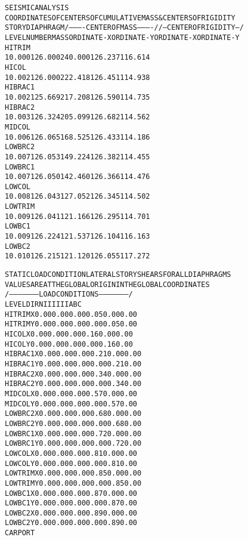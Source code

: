 \documentclass[12pt,notitle,letterpaper]{report}
\renewenvironment{quote}
  {\small\list{}{\rightmargin=0cm \leftmargin=0cm}%
   \item\relax}
  {\endlist}
\begin{document}
\begin{quote}
\begin{alltt}
SEISMIC ANALYSIS
COORDINATES OF CENTERS OF CUMULATIVE MASS & CENTERS OF RIGIDITY
STORY  DIAPHRAGM /----------CENTER OF MASS----------//--CENTER OF RIGIDITY--/
LEVEL     NUMBER        MASS  ORDINATE-X  ORDINATE-Y  ORDINATE-X  ORDINATE-Y
HITRIM
                1       0.000     126.000     240.000     126.237     116.614
HICOL
                1       0.002     126.000     222.418     126.451     114.938
HIBRAC1
                1       0.002     125.669     217.208     126.590     114.735
HIBRAC2
                1       0.003     126.324     205.099     126.682     114.562
MIDCOL
                1       0.006     126.065     168.525     126.433     114.186
LOWBRC2
                1       0.007     126.053     149.224     126.382     114.455
LOWBRC1
                1       0.007     126.050     142.460     126.366     114.476
LOWCOL
                1       0.008     126.043     127.052     126.345     114.502
LOWTRIM
                1       0.009     126.041     121.166     126.295     114.701
LOWBC1
                1       0.009     126.224     121.537     126.104     116.163
LOWBC2
                1       0.010     126.215     121.120     126.055     117.272


STATIC LOAD CONDITION LATERAL STORY SHEARS FOR ALL DIAPHRAGMS
VALUES ARE AT THE GLOBAL ORIGIN IN THE GLOBAL COORDINATES
                /---------------------LOAD  CONDITIONS---------------------/
LEVEL     DIRN           I        II       III         A         B         C
HITRIM       X        0.00      0.00      0.00      0.05      0.00      0.00
HITRIM       Y        0.00      0.00      0.00      0.00      0.05      0.00
HICOL        X        0.00      0.00      0.00      0.16      0.00      0.00
HICOL        Y        0.00      0.00      0.00      0.00      0.16      0.00
HIBRAC1      X        0.00      0.00      0.00      0.21      0.00      0.00
HIBRAC1      Y        0.00      0.00      0.00      0.00      0.21      0.00
HIBRAC2      X        0.00      0.00      0.00      0.34      0.00      0.00
HIBRAC2      Y        0.00      0.00      0.00      0.00      0.34      0.00
MIDCOL       X        0.00      0.00      0.00      0.57      0.00      0.00
MIDCOL       Y        0.00      0.00      0.00      0.00      0.57      0.00
LOWBRC2      X        0.00      0.00      0.00      0.68      0.00      0.00
LOWBRC2      Y        0.00      0.00      0.00      0.00      0.68      0.00
LOWBRC1      X        0.00      0.00      0.00      0.72      0.00      0.00
LOWBRC1      Y        0.00      0.00      0.00      0.00      0.72      0.00
LOWCOL       X        0.00      0.00      0.00      0.81      0.00      0.00
LOWCOL       Y        0.00      0.00      0.00      0.00      0.81      0.00
LOWTRIM      X        0.00      0.00      0.00      0.85      0.00      0.00
LOWTRIM      Y        0.00      0.00      0.00      0.00      0.85      0.00
LOWBC1       X        0.00      0.00      0.00      0.87      0.00      0.00
LOWBC1       Y        0.00      0.00      0.00      0.00      0.87      0.00
LOWBC2       X        0.00      0.00      0.00      0.89      0.00      0.00
LOWBC2       Y        0.00      0.00      0.00      0.00      0.89      0.00
CARPORT


\end{alltt}
\end{quote}
\end{document}
